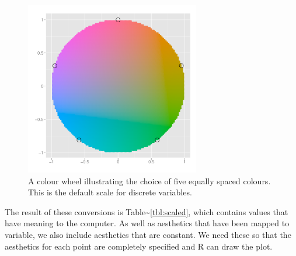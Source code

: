 \begin{figure}[htbp]
  \centering
    \includegraphics[width=3in]{diagrams/colour-wheel}
  \caption{A colour wheel illustrating the choice of five equally spaced colours. This is the default scale for discrete variables.}
  \label{fig:colour-wheel}
\end{figure}

The result of these conversions is
Table\textasciitilde{}\ref{tbl:scaled}, which contains values that have
meaning to the computer. As well as aesthetics that have been mapped to
variable, we also include aesthetics that are constant. We need these so
that the aesthetics for each point are completely specified and R can
draw the plot.


